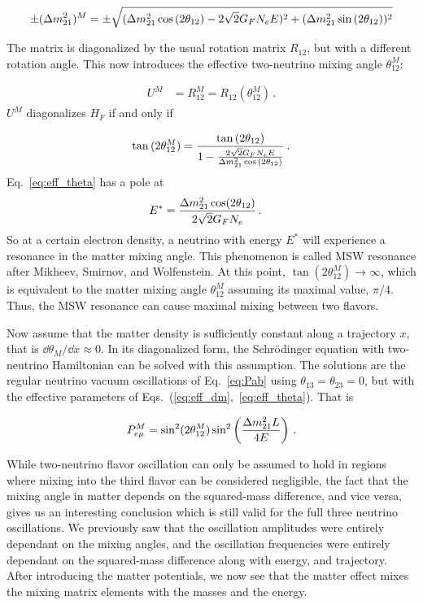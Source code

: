 \begin{align}\label{eq:eff_dm}
    \pm (\dm[21])^M = \pm \sqrt{(\dm[21] \cos{(2\theta_{12}) - 2\sqrt{2}G_F N_e E})^2 + (\dm[21]\sin{(2\theta_{12})})^2}
\end{align}

The matrix is diagonalized by the usual rotation matrix $R_{12}$, but with a different rotation angle. This now introduces the effective two-neutrino mixing angle $\theta_{12}^M$:

\begin{align}
    U^M &= R_{12}^M = R_{12}(\theta_{12}^M)\,.
\end{align}
$U^M$ diagonalizes $H_F$ if and only if 

\begin{align}\label{eq:eff_theta}
    \tan{(2\theta_{12}^M)} = \frac{\tan{(2\theta_{12})}}{1- \frac{2\sqrt{2}G_F N_e E}{\dm[21]\cos{(2\theta_{12})}}}\,.
\end{align}
Eq.~\ref{eq:eff_theta} has a pole at %
\begin{align}
    E^* &= \frac{\dm[21]\cos(2\theta_{12})}{2\sqrt{2}G_F N_e}\,.
\end{align}
So at a certain electron density, a neutrino with energy $E^*$ will experience a resonance in the matter mixing angle. This phenomenon is called MSW resonance after Mikheev, Smirnov, and Wolfenstein. At this point, $\tan{(2\theta_{12}^M)} \to \infty$, which is equivalent to the matter mixing angle $\theta_{12}^M$ assuming its maximal value, $\pi/4$. Thus, the MSW resonance can cause maximal mixing between two flavors. 

Now assume that the matter density is sufficiently constant along a trajectory $x$, that is $\dd \theta_M / \dd x \approx 0$.
In its diagonalized form, the Schrödinger equation with two-neutrino Hamiltonian can be solved with this assumption. 
The solutions are the regular neutrino vacuum oscillations of Eq.~\ref{eq:Pab} using $\theta_{13} = \theta_{23} =0$, but with the effective parameters of Eqs.~(\ref{eq:eff_dm},~\ref{eq:eff_theta}). That is

\begin{align}
    P_{e\mu}^M = \sin^2(2\theta_{12}^M)\sin^2\left(\frac{\dm[21]L}{4E}\right)\,.
\end{align}


While two-neutrino flavor oscillation can only be assumed to hold in regions where mixing into the third flavor can be considered negligible,
the fact that the mixing angle in matter depends on the squared-mass difference, and vice versa, gives us an interesting conclusion which is 
still valid for the full three neutrino oscillations. We previously saw that the oscillation amplitudes were entirely dependant on
the mixing angles, and the oscillation frequencies were entirely dependant on the squared-mass difference along with energy, and trajectory. After 
introducing the matter potentials, we now see that the matter effect mixes the mixing matrix elements with the masses and the energy. 

